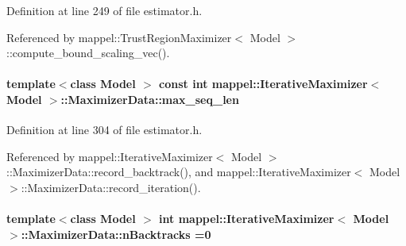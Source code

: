 Definition at line 249 of file estimator.\+h.



Referenced by mappel\+::\+Trust\+Region\+Maximizer$<$ Model $>$\+::compute\+\_\+bound\+\_\+scaling\+\_\+vec().

\paragraph[{\texorpdfstring{max\+\_\+seq\+\_\+len}{max_seq_len}}]{\setlength{\rightskip}{0pt plus 5cm}template$<$class Model $>$ const int {\bf mappel\+::\+Iterative\+Maximizer}$<$ Model $>$\+::Maximizer\+Data\+::max\+\_\+seq\+\_\+len\hspace{0.3cm}{\ttfamily [protected]}}\hypertarget{classmappel_1_1IterativeMaximizer_1_1MaximizerData_aee106ddaebe30496f5280095fc01301a}{}\label{classmappel_1_1IterativeMaximizer_1_1MaximizerData_aee106ddaebe30496f5280095fc01301a}


Definition at line 304 of file estimator.\+h.



Referenced by mappel\+::\+Iterative\+Maximizer$<$ Model $>$\+::\+Maximizer\+Data\+::record\+\_\+backtrack(), and mappel\+::\+Iterative\+Maximizer$<$ Model $>$\+::\+Maximizer\+Data\+::record\+\_\+iteration().

\paragraph[{\texorpdfstring{n\+Backtracks}{nBacktracks}}]{\setlength{\rightskip}{0pt plus 5cm}template$<$class Model $>$ int {\bf mappel\+::\+Iterative\+Maximizer}$<$ Model $>$\+::Maximizer\+Data\+::n\+Backtracks =0}\hypertarget{classmappel_1_1IterativeMaximizer_1_1MaximizerData_a7caa78309de84e0ab4815fc00fbd6cf5}{}\label{classmappel_1_1IterativeMaximizer_1_1MaximizerData_a7caa78309de84e0ab4815fc00fbd6cf5}


